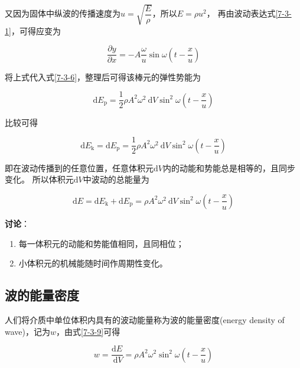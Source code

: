 \documentclass[
	12pt, %
	a4paper, %
]{myLegrandOrangeBook}
\newcommand{\rmd}{\mathrm{d}}
\begin{document}
    又因为固体中纵波的传播速度为\(u = \sqrt{\dfrac{E }{\rho}}\)，所以\(E = \rho u^2\)，
    再由波动表达式\ref{7-3-1}，可得应变为

    \begin{equation}
        \frac{\partial y}{\partial x}=-A \frac{\omega}{u} \sin \omega\left(t-\frac{x}{u}\right)
    \end{equation}

    将上式代入式\ref{7-3-6}，整理后可得该棒元的弹性势能为

    \begin{equation}
        \mathrm{d} E_{\mathrm{p}}=\frac{1}{2} \rho A^2 \omega^2 \mathrm{~d} V \sin ^2 \omega\left(t-\frac{x}{u}\right)
    \end{equation}

    比较可得

    $$
        \mathrm{d} E_{\mathrm{k}}=\mathrm{d} E_{\mathrm{p}}=
        \frac{1}{2} \rho A^2 \omega^2 \mathrm{~d} V \sin ^2 \omega\left(t-\frac{x}{u}\right)
    $$

    即在波动传播到的任意位置，任意体积元\(\rmd V\)内的动能和势能总是相等的，且同步变化。
    所以体积元\(\rmd V\)中波动的总能量为

    \begin{equation}
        \mathrm{d} E=\mathrm{d} E_{\mathrm{k}}+\mathrm{d} E_{\mathrm{p}}=\rho A^2 \omega^2 \mathrm{~d} V \sin ^2 \omega\left(t-\frac{x}{u}\right)
        \label{7-3-9}
    \end{equation}

    \textbf{讨论}：

    \begin{enumerate}
        \item 每一体积元的动能和势能值相同，且同相位；
        \item 小体积元的机械能随时间作周期性变化。
    \end{enumerate}

\subsection{波的能量密度}

    人们将介质中单位体积内具有的波动能量称为波的能量密度(energy density of wave)，记为$w$，由式\ref{7-3-9}可得

    \begin{equation}
        w=\frac{\mathrm{d} E}{\mathrm{~d} V}=\rho A^2 \omega^2 \sin ^2 \omega\left(t-\frac{x}{u}\right)
    \end{equation}
\end{document}

